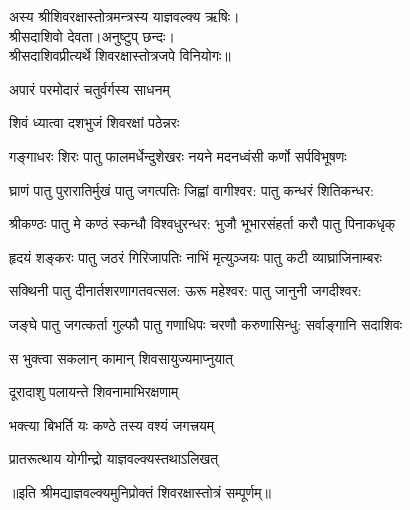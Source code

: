 
\clearpage
{}
अस्य श्रीशिवरक्षास्तोत्रमन्त्रस्य याज्ञवल्क्य ऋषिः।\\ 
श्रीसदाशिवो देवता।अनुष्टुप् छन्दः।\\ 
श्रीसदाशिवप्रीत्यर्थे शिवरक्षास्तोत्रजपे विनियोगः॥

{अपारं परमोदारं चतुर्वर्गस्य साधनम्}

{शिवं ध्यात्वा दशभुजं शिवरक्षां पठेन्नरः}


\resetShloka
\twolineshloka
{गङ्गाधरः शिरः पातु फालमर्धेन्दुशेखरः}
{नयने मदनध्वंसी कर्णो सर्पविभूषणः} 

\twolineshloka
{घ्राणं पातु पुरारातिर्मुखं पातु जगत्पतिः}
{जिह्वां वागीश्वर: पातु कन्धरं शितिकन्धर:}

\twolineshloka
{श्रीकण्ठः पातु मे कण्ठं स्कन्धौ विश्वधुरन्धर:}
{भुजौ भूभारसंहर्ता करौ पातु पिनाकधृक्}

\twolineshloka
{हृदयं शङ्करः पातु जठरं गिरिजापतिः}
{नाभिं मृत्युञ्जयः पातु कटी व्याघ्राजिनाम्बरः}

\twolineshloka
{सक्थिनी पातु दीनार्तशरणागतवत्सल:}
{ऊरू महेश्वर: पातु जानुनी जगदीश्वर: }

\twolineshloka
{जङ्घे पातु जगत्कर्ता गुल्फौ पातु गणाधिपः}
{चरणौ करुणासिन्धु: सर्वाङ्गानि सदाशिवः}

{स भुक्त्वा सकलान् कामान् शिवसायुज्यमाप्नुयात्}

{दूरादाशु पलायन्ते शिवनामाभिरक्षणाम्}

{भक्त्या बिभर्ति यः कण्ठे तस्य वश्यं जगत्त्रयम्}

{प्रातरूत्थाय योगीन्द्रो याज्ञवल्क्यस्तथाऽलिखत्}

॥इति श्रीमद्याज्ञवल्क्यमुनिप्रोक्तं शिवरक्षास्तोत्रं सम्पूर्णम्॥